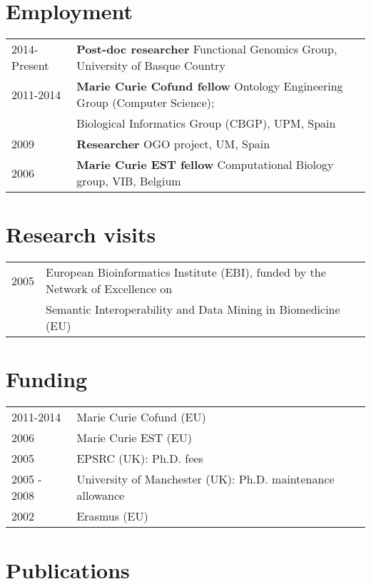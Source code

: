 \documentclass[11pt,fullpage]{article}
\begin{document}
\section*{Employment}


\begin{tabular}{ll}
 2014-Present & {\bf Post-doc researcher} Functional Genomics Group, University of Basque Country  \\
 2011-2014 & {\bf Marie Curie Cofund fellow} Ontology Engineering Group (Computer Science); \\ 
	    &Biological Informatics Group (CBGP), UPM, Spain \\
 2009 & {\bf Researcher} OGO project, UM, Spain \\
 2006 & {\bf Marie Curie EST fellow} Computational Biology group, VIB, Belgium \\
\end{tabular}

\section*{Research visits}

\begin{tabular}{ll}
 2005 & European Bioinformatics Institute (EBI), funded by the Network of Excellence on \\ 
      & Semantic Interoperability and Data Mining in Biomedicine (EU)

\end{tabular}   

\section*{Funding}

\begin{tabular}{ll}
	2011-2014 & Marie Curie Cofund (EU) \\  
	2006 & Marie Curie EST (EU) \\
	2005 & EPSRC (UK): Ph.D. fees \\
	2005 - 2008 & University of Manchester (UK): Ph.D. maintenance allowance \\
	2002 & Erasmus (EU) \\
\end{tabular}

\section*{Publications}
 
\end{document}
